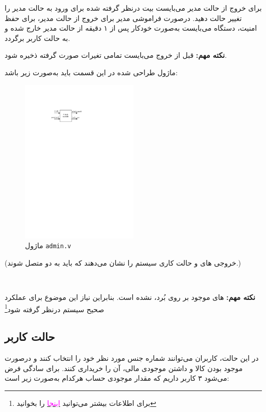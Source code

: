 \documentclass[]{article}
\begin{document}
برای خروج از حالت مدیر می‌بایست بیت درنظر گرفته شده برای ورود به حالت مدیر را تغییر حالت دهید. درصورت فراموشی مدیر برای خروج از حالت مدیر، برای حفظ امنیت، دستگاه می‌بایست به‌صورت خودکار پس از ۱ دقیقه از حالت مدیر خارج شده و به حالت کاربر برگردد.

\textbf{نکته مهم: }قبل از خروج می‌بایست تمامی تغیرات صورت گرفته ذخیره شود.



ماژول طراحی شده در این قسمت باید به‌صورت زیر باشد:


\begin{figure}[h]
	\centering
	\includegraphics[width=0.5\textwidth]{images/admin.pdf}
	\caption{ماژول \texttt{admin.v}}
	\label{ماژول admin.v}
\end{figure}

 (خروجی های  و  حالت کاری سیستم را نشان می‌دهند که باید به دو  متصل شوند.)



\newpage
\Large \textbf{\\
}


\textbf{نکته مهم:}  های موجود بر روی بُرد،  نشده است. بنابراین نیاز این موضوع برای عملکرد صحیح سیستم درنظر گرفته شود\footnote{برای اطلاعات بیشتر می‌توانید \href{https://www.geeksforgeeks.org/switch-debounce-in-digital-circuits/}{\textcolor{magenta}{اینجا}} را بخوانید}




\subsection*{{\titr حالت کاربر}} 
در این حالت، کاربران می‌توانند شماره جنس مورد نظر خود را انتخاب کنند و درصورت موجود بودن کالا و داشتن موجودی مالی، آن را خریداری کنند. برای سادگی فرض می‌شود ۳ کاربر داریم که مقدار موجودی حساب هرکدام به‌صورت زیر است:
\end{document}
